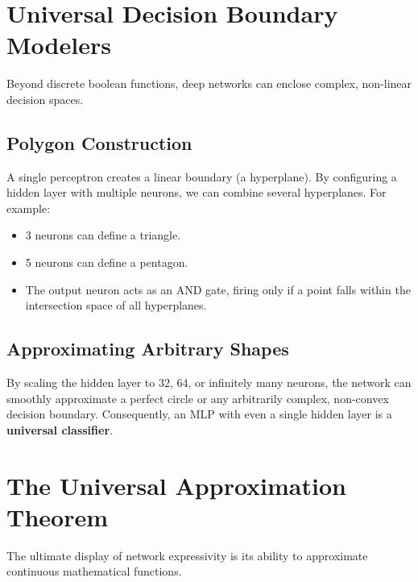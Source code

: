 
\section{Universal Decision Boundary Modelers}

Beyond discrete boolean functions, deep networks can enclose complex, non-linear decision spaces.

\subsection{Polygon Construction}
A single perceptron creates a linear boundary (a hyperplane). By configuring a hidden layer with multiple neurons, we can combine several hyperplanes. For example:
\begin{itemize}
    \item 3 neurons can define a triangle.
    \item 5 neurons can define a pentagon.
    \item The output neuron acts as an AND gate, firing only if a point falls within the intersection space of all hyperplanes.
\end{itemize}

\subsection{Approximating Arbitrary Shapes}
By scaling the hidden layer to 32, 64, or infinitely many neurons, the network can smoothly approximate a perfect circle or any arbitrarily complex, non-convex decision boundary. Consequently, an MLP with even a single hidden layer is a \textbf{universal classifier}.


\section{The Universal Approximation Theorem}

The ultimate display of network expressivity is its ability to approximate continuous mathematical functions.

